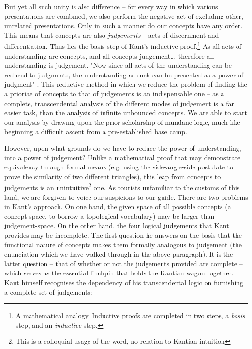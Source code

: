 But yet all such unity is also difference -- for every way in which various presentations are combined, we also perform the negative act of excluding other, unrelated presentations. Only in such a manner do our concepts have any order. This means that concepts are also \emph{judgements} -- acts of discernment and differentiation. Thus lies the basis step of Kant's inductive proof.\footnote{A mathematical analogy. Inductive proofs are completed in two steps, a \emph{basis} step, and an \emph{inductive} step.} As all acts of understanding are concepts, and all concepts judgement\ldots\ therefore all understanding is judgement. "Now since all acts of the understanding can be reduced to judgments, the understanding as such can be presented as a power of judgment" \autocite[B94]{hackett}. This reductive method in which we reduce the problem of finding the a prioriae of concepts to that of judgements is an indispensable one -- as a complete, transcendental analysis of the different modes of judgement is a far easier task, than the analysis of infinite unbounded concepts. We are able to start our analysis by drawing upon the prior scholarship of mundane logic, much like beginning a difficult ascent from a pre-established base camp.



However, upon what grounds do we have to reduce the power of understanding, into a power of judgement? Unlike a mathematical proof that may demonstrate equivalency through formal means (e.g. using the side-angle-side postulate to prove the similarity of two different triangles), this leap from concepts to judgements is an unintuitive\footnote{This is a colloquial usage of the word, no relation to Kantian intuition} one. As tourists unfamiliar to the customs of this land, we are forgiven to voice our suspicions to our guide. There are two problems in Kant's approach. On one hand, the given space of all possible concepts (a concept-space, to borrow a topological vocabulary) may be larger than judgement-space. On the other hand, the four logical judgements that Kant provides may be incomplete. The first question he answers on the basis that the functional nature of concepts makes them formally analogous to judgement (the enunciation which we have walked through in the above paragraph). It is the latter question -- that of whether or not the judgements provided are complete -- which serves as the essential linchpin that holds the Kantian wagon together. Kant himself recognises the dependency of his transcendental logic on furnishing a complete set of judgements:

